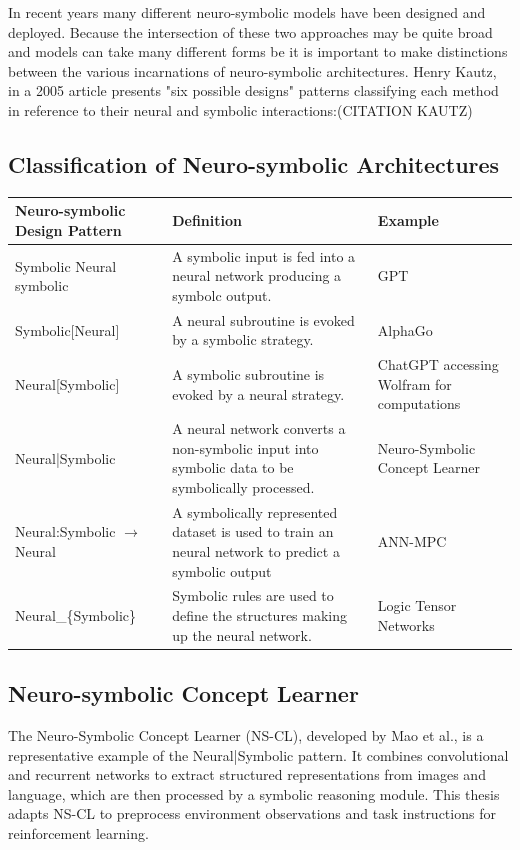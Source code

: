 In recent years many different neuro-symbolic models have been designed and deployed. Because the intersection of these two approaches may be quite broad and models can take many different forms be it is important to make distinctions between the various incarnations of neuro-symbolic architectures. Henry Kautz, in a 2005 article presents "six possible designs" patterns classifying each method in reference to their neural and symbolic interactions:(CITATION KAUTZ)

\subsection{Classification of Neuro-symbolic Architectures} \label{ss:classification}
\begin{scriptsize}
	\begin{center}
		\begin{tabular}{ | m{5cm} | m{5cm}| m{5cm} | }
			\hline
			\textbf{Neuro-symbolic Design Pattern} & \textbf{Definition} & \textbf{Example}\\
			\hline
			Symbolic Neural symbolic & A symbolic input is fed into a neural network producing a symbolc output. & GPT \\
			\hline
			Symbolic[Neural] & A neural subroutine is evoked by a symbolic strategy. & AlphaGo \\
			\hline
			Neural[Symbolic] & A symbolic subroutine is evoked by a neural strategy. & ChatGPT accessing Wolfram for computations\\
			\hline
			Neural|Symbolic & A neural network converts a non-symbolic input into symbolic data to be symbolically processed. & Neuro-Symbolic Concept Learner \\
			\hline
			Neural:Symbolic $\rightarrow$ Neural & A symbolically represented dataset is used to train an neural network to predict a symbolic output & ANN-MPC \\
			\hline
			Neural\_\{Symbolic\} & Symbolic rules are used to define the structures making up the neural network. & Logic Tensor Networks \\
			\hline
		\end{tabular}
	\end{center}
\end{scriptsize}
\subsection{Neuro-symbolic Concept Learner} \label{ss:neurosymbolic_concept_learner}
The Neuro-Symbolic Concept Learner (NS-CL), developed by Mao et al., is a representative example of the Neural|Symbolic pattern. It combines convolutional and recurrent networks to extract structured representations from images and language, which are then processed by a symbolic reasoning module. This thesis adapts NS-CL to preprocess environment observations and task instructions for reinforcement learning.

